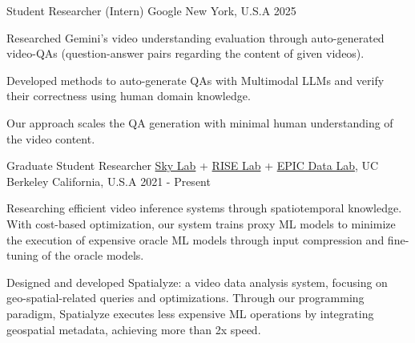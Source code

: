 

\begin{cventries}

  \cvwork
    {Student Researcher (Intern)} %
    {Google} %
    {New York, U.S.A} %
    {2025} %
    {
      \begin{cvitems} %
        \item{Researched Gemini's video understanding evaluation through auto-generated video-QAs (question-answer pairs regarding the content of given videos).}
        \item{Developed methods to auto-generate QAs with Multimodal LLMs and verify their correctness using human domain knowledge.}
        \item{Our approach scales the QA generation with minimal human understanding of the video content.}
      \end{cvitems}
    }

  \cvwork
    {Graduate Student Researcher} %
    {
        \href{https://sky.cs.berkeley.edu/}{Sky Lab} +
        \href{https://rise.cs.berkeley.edu/}{RISE Lab} +
        \href{https://epic.berkeley.edu/}{EPIC Data Lab}, UC Berkeley
    } %
    {California, U.S.A} %
    {2021 - Present} %
    {
      \begin{cvitems} %
        \item{Researching efficient video inference systems through spatiotemporal knowledge.
        With cost-based optimization, our system trains proxy ML models to minimize the execution of expensive oracle ML models through input compression and fine-tuning of the oracle models.}
        \item{Designed and developed Spatialyze: a video data analysis system, focusing on geo-spatial-related queries and optimizations. Through our programming paradigm, Spatialyze executes less expensive ML operations by integrating geospatial metadata, achieving more than 2x speed.}
      \end{cvitems}
    }


\end{cventries}
